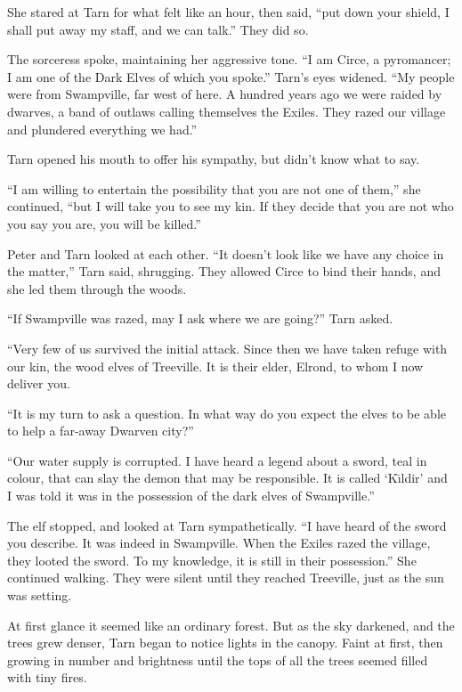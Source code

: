 She stared at Tarn for what felt like an hour, then said, ``put down your shield, I shall put away my staff, and we can talk.''  They did so.

The sorceress spoke, maintaining her aggressive tone.  ``I am Circe, a pyromancer; I am one of the Dark Elves of which you spoke.''  Tarn's eyes widened.  ``My people were from Swampville, far west of here.  A hundred years ago we were raided by dwarves, a band of outlaws calling themselves the Exiles.  They razed our village and plundered everything we had.''

Tarn opened his mouth to offer his sympathy, but didn't know what to say.

``I am willing to entertain the possibility that you are not one of them,'' she continued, ``but I will take you to see my kin.  If they decide that you are not who you say you are, you will be killed.''

Peter and Tarn looked at each other.  ``It doesn't look like we have any choice in the matter,'' Tarn said, shrugging.  They allowed Circe to bind their hands, and she led them through the woods.

``If Swampville was razed, may I ask where we are going?'' Tarn asked.

``Very few of us survived the initial attack.  Since then we have taken refuge with our kin, the wood elves of Treeville.  It is their elder, Elrond, to whom I now deliver you.

``It is my turn to ask a question.  In what way do you expect the elves to be able to help a far-away Dwarven city?''

``Our water supply is corrupted.  I have heard a legend about a sword, teal in colour, that can slay the demon that may be responsible.  It is called `K\=\i{}ldir' and I was told it was in the possession of the dark elves of Swampville.''

The elf stopped, and looked at Tarn sympathetically.  ``I have heard of the sword you describe.  It was indeed in Swampville.  When the Exiles razed the village, they looted the sword.  To my knowledge, it is still in their possession.''  She continued walking.  They were silent until they reached Treeville, just as the sun was setting.

At first glance it seemed like an ordinary forest.  But as the sky darkened, and the trees grew denser, Tarn began to notice lights in the canopy.  Faint at first, then growing in number and brightness until the tops of all the trees seemed filled with tiny fires.

